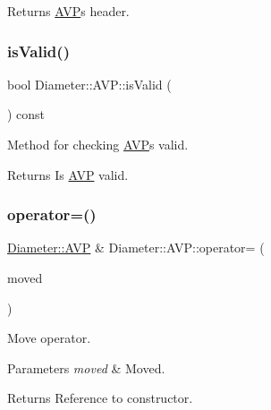 \begin{DoxyReturn}{Returns}
\hyperlink{classDiameter_1_1AVP}{A\+VP}\textquotesingle{}s header. 
\end{DoxyReturn}
\mbox{\label{classDiameter_1_1AVP_a62d6c475e55729eb6fb15e442bc9bd65}} 
\subsubsection{\texorpdfstring{is\+Valid()}{isValid()}}
{\footnotesize\ttfamily bool Diameter\+::\+A\+V\+P\+::is\+Valid (\begin{DoxyParamCaption}{ }\end{DoxyParamCaption}) const}



Method for checking \hyperlink{classDiameter_1_1AVP}{A\+VP}\textquotesingle{}s valid. 

\begin{DoxyReturn}{Returns}
Is \hyperlink{classDiameter_1_1AVP}{A\+VP} valid. 
\end{DoxyReturn}
\mbox{\label{classDiameter_1_1AVP_a8b3cb410b287be025497c50f0a2f95d6}} 
\subsubsection{\texorpdfstring{operator=()}{operator=()}\hspace{0.1cm}{\footnotesize\ttfamily [1/2]}}
{\footnotesize\ttfamily \hyperlink{classDiameter_1_1AVP}{Diameter\+::\+A\+VP} \& Diameter\+::\+A\+V\+P\+::operator= (\begin{DoxyParamCaption}\item[{\hyperlink{classDiameter_1_1AVP}{Diameter\+::\+A\+VP} \&\&}]{moved }\end{DoxyParamCaption})\hspace{0.3cm}{\ttfamily [noexcept]}}



Move operator. 


\begin{DoxyParams}{Parameters}
{\em moved} & Moved. \\
\hline
\end{DoxyParams}
\begin{DoxyReturn}{Returns}
Reference to constructor. 
\end{DoxyReturn}
\mbox{\label{classDiameter_1_1AVP_a5c9f6918febdf967fbe9e196f4a22b64}} 
